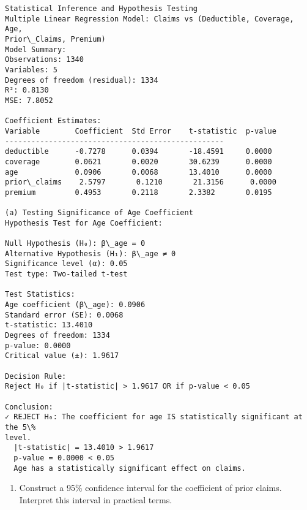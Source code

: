\documentclass[8pt, twocolumn]{extarticle}
\providecommand{\tightlist}{%
      \setlength{\itemsep}{0pt}\setlength{\parskip}{0pt}}
\begin{document}
    \begin{Verbatim}[commandchars=\\\{\}]
Statistical Inference and Hypothesis Testing
Multiple Linear Regression Model: Claims vs (Deductible, Coverage, Age,
Prior\_Claims, Premium)
Model Summary:
Observations: 1340
Variables: 5
Degrees of freedom (residual): 1334
R²: 0.8130
MSE: 7.8052

Coefficient Estimates:
Variable        Coefficient  Std Error    t-statistic  p-value
--------------------------------------------------
deductible      -0.7278      0.0394       -18.4591     0.0000
coverage        0.0621       0.0020       30.6239      0.0000
age             0.0906       0.0068       13.4010      0.0000
prior\_claims    2.5797       0.1210       21.3156      0.0000
premium         0.4953       0.2118       2.3382       0.0195

(a) Testing Significance of Age Coefficient
Hypothesis Test for Age Coefficient:

Null Hypothesis (H₀): β\_age = 0
Alternative Hypothesis (H₁): β\_age ≠ 0
Significance level (α): 0.05
Test type: Two-tailed t-test

Test Statistics:
Age coefficient (β\_age): 0.0906
Standard error (SE): 0.0068
t-statistic: 13.4010
Degrees of freedom: 1334
p-value: 0.0000
Critical value (±): 1.9617

Decision Rule:
Reject H₀ if |t-statistic| > 1.9617 OR if p-value < 0.05

Conclusion:
✓ REJECT H₀: The coefficient for age IS statistically significant at the 5\%
level.
  |t-statistic| = 13.4010 > 1.9617
  p-value = 0.0000 < 0.05
  Age has a statistically significant effect on claims.
    \end{Verbatim}

    \begin{enumerate}
\def\labelenumi{(\alph{enumi})}
\setcounter{enumi}{1}
\tightlist
\item
  Construct a 95\% confidence interval for the coefficient of prior
  claims. Interpret this interval in practical terms.
\end{enumerate}
\end{document}

